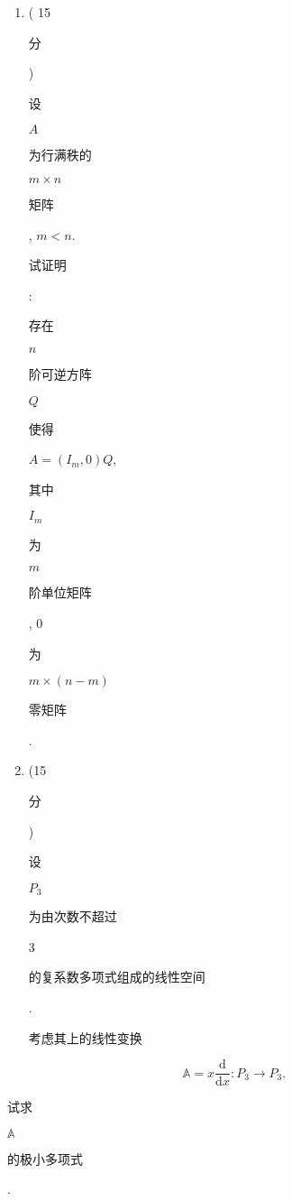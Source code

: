 \documentclass[10pt]{article}
\begin{document}
\begin{enumerate}
  \item ( 15 \begin{CJK}{UTF8}{mj}分\end{CJK}) \begin{CJK}{UTF8}{mj}设\end{CJK} $A$ \begin{CJK}{UTF8}{mj}为行满秩的\end{CJK} $m \times n$ \begin{CJK}{UTF8}{mj}矩阵\end{CJK}, $m<n$. \begin{CJK}{UTF8}{mj}试证明\end{CJK}: \begin{CJK}{UTF8}{mj}存在\end{CJK} $n$ \begin{CJK}{UTF8}{mj}阶可逆方阵\end{CJK} $Q$ \begin{CJK}{UTF8}{mj}使得\end{CJK} $A=\left(I_{m}, 0\right) Q$, \begin{CJK}{UTF8}{mj}其中\end{CJK} $I_{m}$ \begin{CJK}{UTF8}{mj}为\end{CJK} $m$ \begin{CJK}{UTF8}{mj}阶单位矩阵\end{CJK}, 0 \begin{CJK}{UTF8}{mj}为\end{CJK} $m \times(n-m)$ \begin{CJK}{UTF8}{mj}零矩阵\end{CJK}.

  \item (15 \begin{CJK}{UTF8}{mj}分\end{CJK}) \begin{CJK}{UTF8}{mj}设\end{CJK} $P_{3}$ \begin{CJK}{UTF8}{mj}为由次数不超过\end{CJK} 3 \begin{CJK}{UTF8}{mj}的复系数多项式组成的线性空间\end{CJK}. \begin{CJK}{UTF8}{mj}考虑其上的线性变换\end{CJK}

\end{enumerate}
$$
\mathbb{A}=x \frac{\mathrm{d}}{\mathrm{d} x}: P_{3} \rightarrow P_{3} .
$$
\begin{CJK}{UTF8}{mj}试求\end{CJK} $\mathbb{A}$ \begin{CJK}{UTF8}{mj}的极小多项式\end{CJK}.
\end{document}
